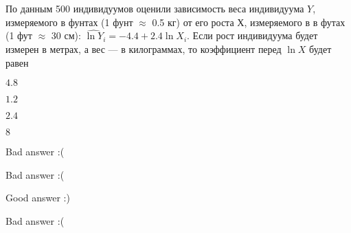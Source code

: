 
\begin{question}
По данным 500 индивидуумов оценили зависимость веса индивидуума \(Y\),
измеряемого в фунтах (1 фунт \(\approx\) 0.5 кг) от его роста \(Х\),
измеряемого в в футах (1 фут \(\approx\) 30 см):
\(\widehat{\ln Y}_i = -4.4 + 2.4 \ln X_i\).
Если рост индивидуума будет измерен в метрах, а вес --- в килограммах,
то коэффициент перед \(\ln X\) будет равен
\begin{answerlist}
  \item \(4.8\)
  \item \(1.2\)
  \item \(2.4\)
  \item \(8\)
\end{answerlist}
\end{question}

\begin{solution}
\begin{answerlist}
  \item Bad answer :(
  \item Bad answer :(
  \item Good answer :)
  \item Bad answer :(
\end{answerlist}
\end{solution}

